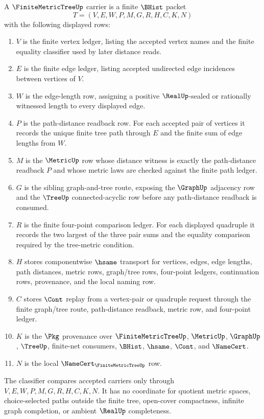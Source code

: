\begin{definition}
\label{def:finite-metric-tree-carrier}
A $\FiniteMetricTreeUp$ carrier is a finite $\BHist$ packet
$$
T=(V,E,W,P,M,G,R,H,C,K,N)
$$
with the following displayed rows:
\begin{enumerate}
\item $V$ is the finite vertex ledger, listing the accepted vertex names and the finite equality classifier used by later distance reads.
\item $E$ is the finite edge ledger, listing accepted undirected edge incidences between vertices of $V$.
\item $W$ is the edge-length row, assigning a positive $\RealUp$-sealed or rationally witnessed length to every displayed edge.
\item $P$ is the path-distance readback row. For each accepted pair of vertices it records the unique finite tree path through $E$ and the finite sum of edge lengths from $W$.
\item $M$ is the $\MetricUp$ row whose distance witness is exactly the path-distance readback $P$ and whose metric laws are checked against the finite path ledger.
\item $G$ is the sibling graph-and-tree route, exposing the $\GraphUp$ adjacency row and the $\TreeUp$ connected-acyclic row before any path-distance readback is consumed.
\item $R$ is the finite four-point comparison ledger. For each displayed quadruple it records the two largest of the three pair sums and the equality comparison required by the tree-metric condition.
\item $H$ stores componentwise $\hsame$ transport for vertices, edges, edge lengths, path distances, metric rows, graph/tree rows, four-point ledgers, continuation rows, provenance, and the local naming row.
\item $C$ stores $\Cont$ replay from a vertex-pair or quadruple request through the finite graph/tree route, path-distance readback, metric row, and four-point ledger.
\item $K$ is the $\Pkg$ provenance over $\FiniteMetricTreeUp$, $\MetricUp$, $\GraphUp$, $\TreeUp$, finite-net consumers, $\BHist$, $\hsame$, $\Cont$, and $\NameCert$.
\item $N$ is the local $\NameCert_{\FiniteMetricTreeUp}$ row.
\end{enumerate}
The classifier compares accepted carriers only through $V,E,W,P,M,G,R,H,C,K,N$. It has no coordinate for quotient metric spaces, choice-selected paths outside the finite tree, open-cover compactness, infinite graph completion, or ambient $\RealUp$ completeness.
\end{definition}

